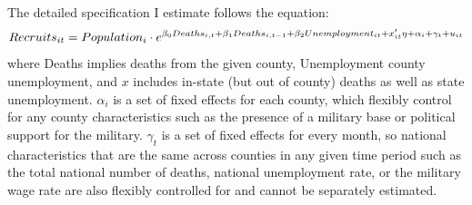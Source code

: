 \documentclass[12pt] {article}
\begin{document}
The detailed specification I estimate follows the equation: 
$$Recruits_{it}=Population_{i}\cdot e^{\beta_{0}Deaths_{i,t}+\beta_{1}Deaths_{i,t-1}+\beta_{2}Unemployment_{it}\\
+x'_{it}\eta+\alpha_{i}+\gamma_{t}+u_{it}}$$
where Deaths implies deaths from the given county, Unemployment county unemployment, and $x$ includes in-state (but out of county) deaths as well as
state unemployment. $\alpha_{i}$ is a set of fixed effects for each county, which flexibly control for any county characteristics such as the presence of a military base or political support for the military. $\gamma_{t}$ is a set of fixed effects for every month, so national characteristics that are the same across counties in any
given time period such as the total national number of deaths, national
unemployment rate, or the military wage rate are also flexibly controlled for and cannot be separately estimated. 


 


\end{document}

